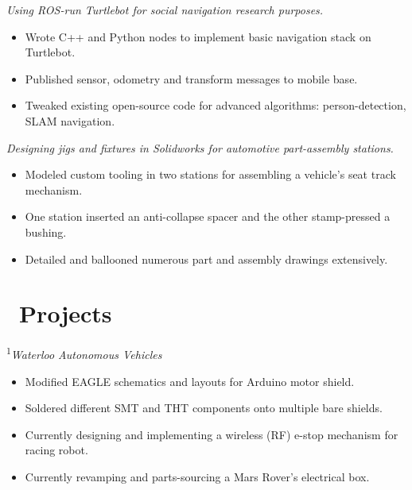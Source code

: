 \documentclass{resume}
\begin{document}
\textit{Using ROS-run Turtlebot for social navigation research purposes.}
\begin{itemize}
  \item Wrote C++ and Python nodes to implement basic navigation stack on Turtlebot. 
  \item Published sensor, odometry and transform messages to mobile base.
  \item Tweaked existing open-source code for advanced algorithms: person-detection, SLAM navigation.
\end{itemize}
\nspacen{}

\textit{Designing jigs and fixtures in Solidworks for automotive part-assembly stations.}
\begin{itemize}
  \item Modeled custom tooling in two stations for assembling a vehicle's seat track mechanism. 
  \item One station inserted an anti-collapse spacer and the other stamp-pressed a bushing.
  \item Detailed and ballooned numerous part and assembly drawings extensively.
\end{itemize}
\nspace{}

\section{\faFlask\ Projects}

\textsuperscript{1}\textit{Waterloo Autonomous Vehicles}
\begin{itemize}
  \item Modified EAGLE schematics and layouts for Arduino motor shield. 
  \item Soldered different SMT and THT components onto multiple bare shields.
  \item Currently designing and implementing a wireless (RF) e-stop mechanism for racing robot.
  \item Currently revamping and parts-sourcing a Mars Rover's electrical box. 
\end{itemize}
\nspacen{}
\end{document}

